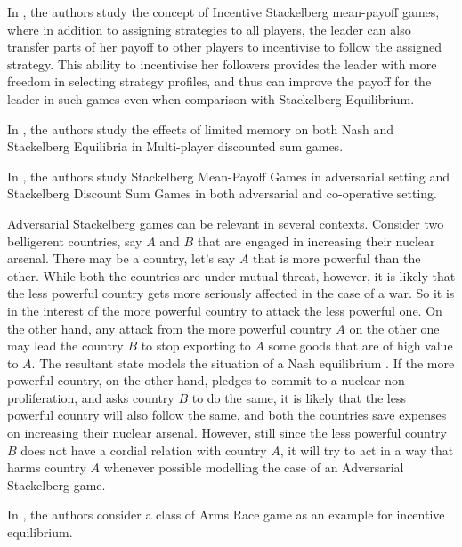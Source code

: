 In \cite{GSTDP16}, the authors study the concept of Incentive Stackelberg mean-payoff games, where in addition to assigning strategies to all players, the leader can also transfer parts of her payoff to other players to incentivise to follow the assigned strategy. This ability to incentivise her followers provides the leader with more freedom in selecting strategy profiles, and thus can improve the payoff for the leader in such games even when comparison with Stackelberg Equilibrium.

In \cite{GS15}, the authors study the effects of limited memory on both Nash and Stackelberg Equilibria in Multi-player discounted sum games. 

In \cite{FGR20}, the authors study Stackelberg Mean-Payoff Games in adversarial setting and  Stackelberg Discount Sum Games in both adversarial and co-operative setting.

Adversarial Stackelberg games can be relevant in several contexts. Consider two belligerent countries, say $A$ and $B$ that are engaged in increasing their nuclear arsenal. There may be a country, let's say $A$ that is more powerful than the other. While both the countries are under mutual threat, however, it is likely that the less powerful country gets more seriously affected in the case of a war. So it is in the interest of the more powerful country to attack the less powerful one. On the other hand, any attack from the more powerful country $A$ on the other one may lead the country $B$ to stop exporting to $A$ some goods that are of high value to $A$. The resultant state models the situation of a Nash equilibrium . If the more powerful country, on the other hand, pledges to commit to a nuclear non-proliferation, and asks country $B$ to do the same, it is likely that the less powerful country will also follow the same, and both the countries save expenses on increasing their nuclear arsenal. However, still since the less powerful country $B$ does not have a cordial relation with country $A$, it will try to act in a way that harms  country $A$ whenever possible modelling the case of an Adversarial Stackelberg game.

In \cite{GS18}, the authors consider a class of Arms Race game as an example for incentive equilibrium.


